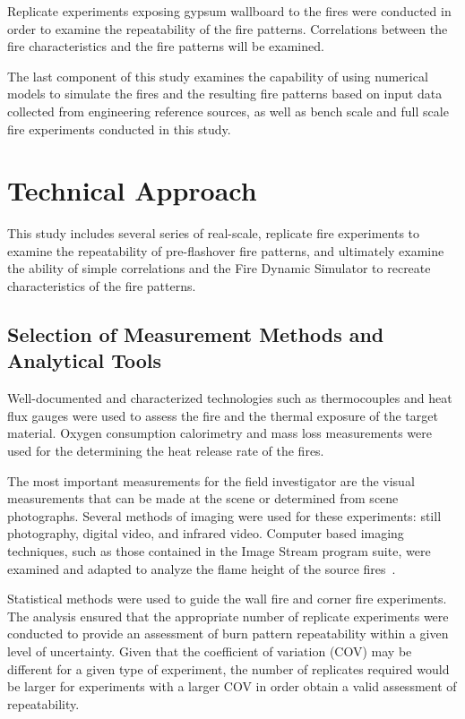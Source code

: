\documentclass[twoside]{uocthesis}
\begin{document}
Replicate experiments exposing gypsum wallboard to the fires were conducted in order to examine the repeatability of the fire patterns.  Correlations between the fire characteristics and the fire patterns will be examined.

The last component of this study examines the capability of using numerical models to simulate the fires and the resulting fire patterns based on input data collected from engineering reference sources, as well as bench scale and full scale fire experiments conducted in this study.

\section{Technical Approach}


This study includes several series of real-scale, replicate fire experiments to examine the repeatability of pre-flashover fire patterns, and ultimately examine the ability of simple correlations and the Fire Dynamic Simulator to recreate characteristics of the fire patterns.

\subsection{Selection of Measurement Methods and Analytical Tools}

Well-documented and characterized technologies such as thermocouples and heat flux gauges were used to assess the fire and the thermal exposure of the target material.  Oxygen consumption calorimetry and mass loss measurements were used for the determining the heat release rate of the fires.

The most important measurements for the field investigator are the visual measurements that can be made at the scene or determined from scene photographs. Several methods of imaging were used for these experiments: still photography, digital video, and infrared video.  Computer based imaging techniques, such as those contained in the Image Stream program suite, were examined and adapted to analyze the flame height of the source fires~\cite{Nokes:2011}.

Statistical methods were used to guide the wall fire and corner fire experiments.  The analysis ensured that the appropriate number of replicate experiments were conducted to provide an assessment of burn pattern repeatability within a given level of uncertainty.  Given that the coefficient of variation (COV) may be different for a given type of experiment, the number of replicates required would be larger for experiments with a larger COV in order obtain a valid assessment of repeatability.
\end{document}

